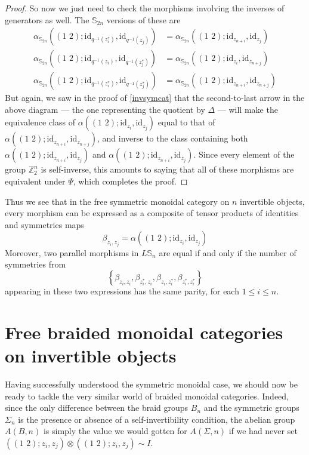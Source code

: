 \documentclass{amsbook} %
\newcommand{\id}{\textrm{id}}
\newcommand{\trans}[2]{( #1 \, \, #2 )}
\numberwithin{section}{chapter}
\begin{document}
\begin{proof}
So now we just need to check the morphisms involving the inverses of generators as well. The $\mathbb{S}_{2n}$ versions of these are
  \begin{align*}
  	\alpha_{\mathbb{S}_{2n}}\left(  \trans{1}{2}  ;  \id_{q^{-1}(z_i^*)}, \id_{q^{-1}(z_j)}  \right) &= \alpha_{\mathbb{S}_{2n}}\left(  \trans{1}{2}  ;  \id_{z_{n+i}}, \id_{z_j}  \right) \\
  	\alpha_{\mathbb{S}_{2n}}\left(  \trans{1}{2}  ;  \id_{q^{-1}(z_i)}, \id_{q^{-1}(z_j^*)}  \right) &= \alpha_{\mathbb{S}_{2n}}\left(  \trans{1}{2}  ;  \id_{z_i}, \id_{z_{n+j}}  \right) \\
  	\alpha_{\mathbb{S}_{2n}}\left(  \trans{1}{2}  ;  \id_{q^{-1}(z_i^*)}, \id_{q^{-1}(z_j^*)}  \right) &= \alpha_{\mathbb{S}_{2n}}\left(  \trans{1}{2}  ;  \id_{z_{n+i}}, \id_{z_{n+j}}  \right)
  \end{align*}
But again, we saw in the proof of \cref{invsymcat} that the second-to-last arrow in the above diagram --- the one representing the quotient by $\Delta$ --- will make the equivalence class of $\alpha(\trans{1}{2};\id_{z_i}, \id_{z_j})$ equal to that of $\alpha(\trans{1}{2}; \id_{z_{n+i}}, \id_{z_{n+j}})$, and inverse to the class containing both $\alpha(\trans{1}{2}; \id_{z_{n+i}}, \id_{z_j})$ and $\alpha(\trans{1}{2}; \id_{z_{n+i}}, \id_{z_j})$. Since every element of the group $\mathbb{Z}_2^{n}$ is self-inverse, this amounts to saying that all of these morphisms are equivalent under $\Psi$, which completes the proof. 
\end{proof}

Thus we see that in the free symmetric monoidal category on $n$ invertible objects, every morphism can be expressed as a composite of tensor products of identities and symmetries maps
  \[
    \beta_{z_i, z_j} = \alpha\left( \trans{1}{2}  ;  \id_{z_i}, \id_{z_j}  \right)
  \]
Moreover, two parallel morphisms in $L\mathbb{S}_n$ are equal if and only if the number of symmetries from
  \[
    \left\{ \beta_{z_i, z_i},  \beta_{z_i^*, z_i}, \beta_{z_i, z_i^*}, \beta_{z_i^*, z_i^*} \right\}
  \]
appearing in these two expressions has the same parity, for each $1 \le i \le n$.

\section{Free braided monoidal categories on invertible objects} 

Having successfully understood the symmetric monoidal case, we should now be ready to tackle the very similar world of braided monoidal categories. Indeed, since the only difference between the braid groups $B_{n}$ and the symmetric groups $\Sigma_{n}$ is the presence or absence of a self-invertibility condition, the abelian group $A(B,n)$ is simply the value we would gotten for $A(\Sigma,n)$ if we had never set $(\trans{1}{2}; z_i, z_j) \otimes (\trans{1}{2}; z_i, z_j) \sim I$.
\end{document}
